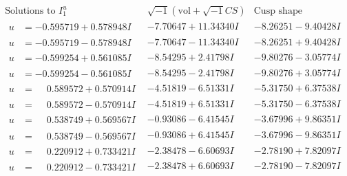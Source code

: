 \documentclass[1p]{elsarticle_modified}
\theoremstyle{definition}
\newcommand{\I}{\sqrt{-1}}
\begin{document}
$$\begin{array}{c|c|c}  
\text{Solutions to }I^u_{1}& \I (\text{vol} + \sqrt{-1}CS) & \text{Cusp shape}\\
 \hline 
\begin{aligned}
u &= -0.595719 + 0.578948 I\end{aligned}
 & -7.70647 + 11.34340 I & -8.26251 - 9.40428 I \\ \hline\begin{aligned}
u &= -0.595719 - 0.578948 I\end{aligned}
 & -7.70647 - 11.34340 I & -8.26251 + 9.40428 I \\ \hline\begin{aligned}
u &= -0.599254 + 0.561085 I\end{aligned}
 & -8.54295 + 2.41798 I & -9.80276 - 3.05774 I \\ \hline\begin{aligned}
u &= -0.599254 - 0.561085 I\end{aligned}
 & -8.54295 - 2.41798 I & -9.80276 + 3.05774 I \\ \hline\begin{aligned}
u &= \phantom{-}0.589572 + 0.570914 I\end{aligned}
 & -4.51819 - 6.51331 I & -5.31750 + 6.37538 I \\ \hline\begin{aligned}
u &= \phantom{-}0.589572 - 0.570914 I\end{aligned}
 & -4.51819 + 6.51331 I & -5.31750 - 6.37538 I \\ \hline\begin{aligned}
u &= \phantom{-}0.538749 + 0.569567 I\end{aligned}
 & -0.93086 - 6.41545 I & -3.67996 + 9.86351 I \\ \hline\begin{aligned}
u &= \phantom{-}0.538749 - 0.569567 I\end{aligned}
 & -0.93086 + 6.41545 I & -3.67996 - 9.86351 I \\ \hline\begin{aligned}
u &= \phantom{-}0.220912 + 0.733421 I\end{aligned}
 & -2.38478 - 6.60693 I & -2.78190 + 7.82097 I \\ \hline\begin{aligned}
u &= \phantom{-}0.220912 - 0.733421 I\end{aligned}
 & -2.38478 + 6.60693 I & -2.78190 - 7.82097 I \\ \hline\begin{aligned}

\end{aligned}
\end{array}$$
\end{document}
